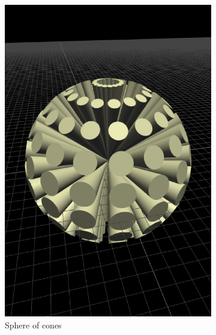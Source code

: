 \begin{figure}
\begin{subfigure}[b]{0.3\linewidth}
    \includegraphics[width=1.0\linewidth]{./images/all_examples/coneSphere_crop}
    \caption{Sphere of cones}
    \label{fig:ex:cone:sphere}
  \end{subfigure}
  \begin{subfigure}[b]{0.3\linewidth}

\end{subfigure}
\end{figure}
